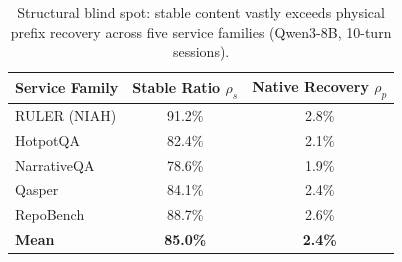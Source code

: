 \begin{table}[t]
\centering
\caption{Structural blind spot: stable content vastly exceeds physical prefix recovery across five service families (Qwen3-8B, 10-turn sessions).}
\label{tab:motivation}
\small
\begin{tabular}{@{}lcc@{}}
\toprule
\textbf{Service Family} & \textbf{Stable Ratio $\rho_s$} & \textbf{Native Recovery $\rho_p$} \\
\midrule
RULER (NIAH)        & 91.2\% & 2.8\% \\
HotpotQA            & 82.4\% & 2.1\% \\
NarrativeQA         & 78.6\% & 1.9\% \\
Qasper              & 84.1\% & 2.4\% \\
RepoBench           & 88.7\% & 2.6\% \\
\midrule
\textbf{Mean}       & \textbf{85.0\%} & \textbf{2.4\%} \\
\bottomrule
\end{tabular}
\end{table}
